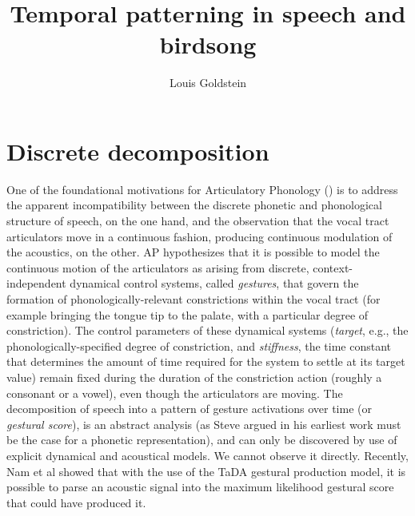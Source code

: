 \documentclass[output=paper,
modfonts
]{LSP/langsci}
\title{Temporal patterning in speech and birdsong}
\author{Louis Goldstein\affiliation{Department of Linguistics, University of Southern California}}
\begin{document}
\maketitle

\section{Discrete decomposition}

One of the foundational motivations for Articulatory Phonology (\citealt{BG92, BG95}) is to address the apparent incompatibility between the discrete phonetic and phonological structure of speech, on the one hand,  and the observation that the vocal tract articulators move in a continuous fashion, producing continuous modulation of the acoustics, on the other.  AP hypothesizes that it is possible to model the continuous motion of the articulators as arising from discrete, context-independent dynamical control systems, called \textit{gestures}, that govern the formation of phonologically-relevant constrictions within the vocal tract (for example bringing the tongue tip to the palate, with a particular degree of constriction). The control parameters of these dynamical systems (\textit{target}, e.g., the phonologically-specified degree of constriction,  and \textit{stiffness}, the time constant that determines the amount of time required for the system to settle at its target value) remain fixed during the duration of the constriction action (roughly a consonant or a vowel), even though the articulators are moving. The decomposition of speech into a pattern of gesture activations over time (or \textit{gestural score}), is an abstract analysis (as Steve argued in his earliest work \citep{anderson74} must be the case for a phonetic representation), and can only be discovered by use of  explicit dynamical and acoustical models.  We cannot observe it directly. Recently,  Nam et al  \citeyearpar{Nam2012} showed that with the use of the TaDA gestural production model, it is possible to parse an acoustic signal into the maximum likelihood gestural score that could have produced it.
\end{document}
